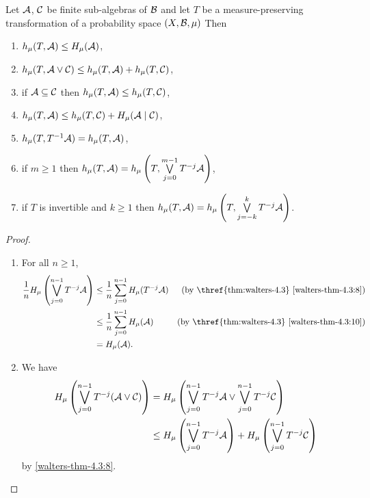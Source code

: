 \begin{theorem} \label{thm:walters-4.12}
	Let $\mathcal{A}$, $\mathcal{C}$ be finite sub-algebras of $\mathcal{B}$ and let $T$ be a measure-preserving transformation of a probability space $(X, \mathcal{B}, \mu)$ Then
	\begin{enumerate}
		\item $h_\mu(T, \mathcal{A}) \leq H_\mu(\mathcal{A})$, \label{walters:thm-4-12:1}
		\item $h_\mu(T, \mathcal{A} \vee \mathcal{C}) \leq h_\mu(T, \mathcal{A}) + h_\mu(T, \mathcal{C})$, \label{walters:thm-4-12:2}
		\item if $\mathcal{A} \subseteq \mathcal{C}$ then $h_\mu(T, \mathcal{A}) \leq h_\mu(T, \mathcal{C})$, \label{walters:thm-4-12:3}
		\item $h_\mu(T, \mathcal{A}) \leq h_\mu(T, \mathcal{C}) + H_\mu(\mathcal{A} \mid \mathcal{C})$, \label{walters:thm-4-12:4}
		\item $h_\mu(T, T^{-1}{\mathcal{A}}) = h_\mu(T, \mathcal{A})$, \label{walters:thm-4-12:5}
		\item if $m \geq 1$ then $h_\mu(T, \mathcal{A}) = h_\mu\left(T, \bigvee\limits_{j = 0}^{m - 1}{T^{-j}{\mathcal{A}}}\right)$, \label{walters:thm-4-12:6}
		\item if $T$ is invertible and $k \geq 1$ then $h_\mu(T, \mathcal{A}) = h_\mu\left(T, \bigvee\limits_{j = -k}^k{T^{-j}{\mathcal{A}}}\right)$. \label{walters:thm-4-12:7}
	\end{enumerate}
	\begin{proof} \hfill
		\begin{enumerate}
			\item For all $n \geq 1$,
				\begin{align*}
					\frac{1}{n} H_\mu\left(\bigjoin_{j = 0}^{n - 1}{T^{-j}{\A}}\right) &\leq \frac{1}{n} \sum_{j = 0}^{n - 1}{H_\mu({T^{-j}{\A}})} & \text{(by \thref{thm:walters-4.3} \ref{walters-thm-4.3:8})} \\
						&\leq \frac{1}{n} \sum_{j = 0}^{n - 1}{H_\mu(\A)} & \text{(by \thref{thm:walters-4.3} \ref{walters-thm-4.3:10})} \\
						&= H_\mu(\A).
				\end{align*}
			\item We have
				\begin{align*}
					H_\mu\left(\bigvee_{j = 0}^{n - 1}{T^{-j}(\mathcal{A} \vee \mathcal{C})}\right) &= H_\mu\left(\bigvee_{j = 0}^{n - 1}{T^{-j}{\mathcal{A}}} \vee \bigvee_{j = 0}^{n - 1}{T^{-j}{\mathcal{C}}}\right) \\
						&\leq H_\mu\left(\bigvee_{j = 0}^{n - 1}{T^{-j}{\mathcal{A}}}\right) + H_\mu\left(\bigvee_{j = 0}^{n - 1}{T^{-j}{\mathcal{C}}}\right)
				\end{align*}
				by  \ref{walters-thm-4.3:8}.

\end{enumerate}
\end{proof}
\end{theorem}
